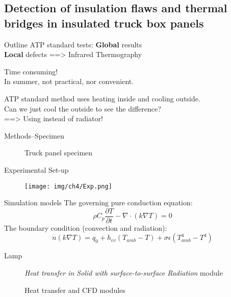 \subsection{Detection of insulation flaws and thermal bridges in insulated truck box panels}

\begin{frame}{Outline}
    ATP standard tests: \textbf{Global} results\\
    \textbf{Local} defects ==> \alert{Infrared Thermography}

    Time consuming!\\
    In summer, not practical, nor convenient.

    ATP standard method uses heating inside and cooling outside.\\
    Can we just cool the outside to see the difference?\\
    ==> Using {\color{cyan}{compressed air}} instead of \alert{radiator!}
\end{frame}


\begin{frame}{Methods--Specimen}
    \begin{figure}[ht]
    \hspace*{-20pt}
    \pause
    \caption{Truck panel specimen}
    \end{figure}
 
\end{frame}


\begin{frame}{Experimental Set-up}
    \begin{figure}[ht]
        \centering
        \texttt{[image: img/ch4/Exp.png]}
    \end{figure}
\end{frame}

\begin{frame}{Simulation models}
 The governing pure conduction equation:
    \begin{equation*}
        \rho C_p \frac{\partial T}{\partial t}-\nabla \cdot (k\nabla T) = 0
    \end{equation*}
The boundary condition (convection and radiation):
    \begin{equation*}
        n(k\nabla T) = q_0 + h_{cv}(T_{amb}-T)+\sigma \epsilon(T_{amb}^4-T^4)
    \end{equation*}
\pause
    \begin{description}
        \item[Lamp {\color{red}{Heating}}] \textit{Heat transfer in Solid with surface-to-surface Radiation} module  
        \item[{\color{cyan}{Air Cooling}}] Heat transfer and CFD modules    
    \end{description}
\end{frame}

